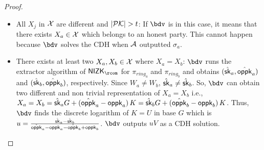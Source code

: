 \begin{proof}
\begin{itemize}
		\item All $ X_j $ in $ {\mathcal{X}} $ are different and $ |{\mathcal{PK}}| > t $: If $ \bdv $ is in this case, it means that there exists $ X_a \in {\ensuremath{\mathcal{X}}} $ which belongs to an honest party. This cannot happen because $ \bdv $ solves the CDH when $ \mathcal{A} $ outputted $ \sigma_a $. 
		\item  There exists at least two $ X_a,X_b \in {\ensuremath{\mathcal{X}}} $ where $ X_a = X_b $: $ \bdv $ runs the extractor algorithm of $ \NIZK_{\rcom} $ for $ \pi_{ring_a} $ and $ \pi_{ring_b} $ and obtains $(\hat{\mathsf{sk}}_a,\hat{\mathsf{oppk}}_a )$ and $(\hat{\mathsf{sk}}_b,\hat{\mathsf{oppk}}_b )$, respectively. Since $ W_a \neq W_b $, $ \hat{\mathsf{sk}}_a \neq \hat{\mathsf{sk}}_b $. So, $ \bdv $ can obtain two different and non trivial representation of $ X_a = X_b $ i.e., $ X_a = X_b = \hat{\mathsf{sk}}_aG + (\hat{\mathsf{oppk}}_a - \mathsf{oppk}_a) \, K = \hat{\mathsf{sk}}_bG + (\hat{\mathsf{oppk}}_b - \mathsf{oppk}_b) \, K $. Thus, $ \bdv $ finds the discrete logarithm of $ K = U $ in base $ G $ which is $ u = \frac{\hat{\mathsf{sk}}_a - \hat{\mathsf{sk}}_b}{\hat{\mathsf{oppk}}_a -\mathsf{oppk}_a -\hat{\mathsf{oppk}}_b + \mathsf{oppk}_b} $. $ \bdv $ outputs $ uV $ as a CDH solution.
	\end{itemize}
	

\end{proof}
